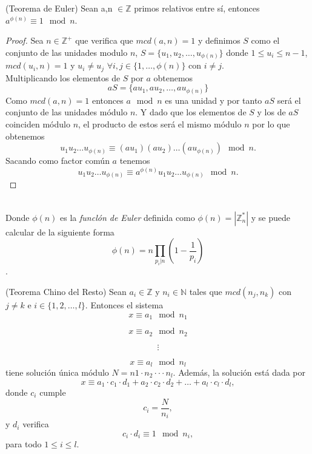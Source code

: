 \begin{teorema}
	(Teorema de Euler) Sean a,n $\in \mathbb{Z}$ primos relativos entre sí, entonces $a^{\phi(n)}\equiv 1 \mod n$.
\end{teorema}\vspace*{-10mm}
\begin{proof}
		Sea $n\in \mathbb{Z^+}$ que verifica que $mcd(a,n)=1$ y definimos $S$ como el conjunto de las unidades modulo $n$, $S=\{u_1,u_2,\dots,u_{\phi(n)}\}$ donde $1\leq u_i\leq n-1$, $mcd(u_i,n)=1$ y $u_i\neq u_j$ $\forall i,j \in \{1,\dots,\phi(n)\}$ con $ i\neq j$.\\
	Multiplicando  los elementos de $S$ por $a$ obtenemos 
	$$
		aS=\{au_1,au_2,\dots,au_{\phi(n)}\}
	$$
	Como $mcd(a,n)=1$ entonces $a\mod n$ es una unidad y por tanto $aS$ será el conjunto de las unidades módulo $n$. Y dado que los elementos de $S$ y los de $aS$ coinciden módulo $n$, el producto de estos será el mismo módulo $n$ por lo que obtenemos 
	$$
		u_1u_2\dots u_{\phi(n)} \equiv (au_1)(au_2)\dots (au_{\phi(n)})\mod n.
	$$
	Sacando como factor común $a$ tenemos 
	$$
		u_1u_2\dots u_{\phi(n)} \equiv a^{\phi(n)}u_1u_2\dots u_{\phi(n)}\mod n.
	$$
\end{proof}\\
Donde $\phi(n)$ es la \emph{funclón de Euler} definida como $\phi(n)=|\mathbb{Z}^*_n|$ y se puede calcular de la siguiente forma $$\phi(n)=n\prod_{p_i|n}\left(1-\frac{1}{p_i}\right)$$.

\begin{teorema}
		(Teorema Chino del Resto) Sean $a_i\in \mathbb{Z}$ y $n_i \in \mathbb{N}$ tales que $mcd(n_j,n_k)$ con $j\neq k$ e $i \in \{1,2,\dots,l\}$. Entonces el sistema
		$$
			x\equiv a_1 \mod n_1
		$$\vspace*{-10mm}

		$$
			x\equiv a_2 \mod n_2
		$$\vspace*{-10mm}

		$$
			\vdots
		$$\vspace*{-10mm}

		$$
			x\equiv a_l \mod n_l
		$$
	tiene solución única módulo $N=n1\cdot n_2\cdot\cdot\cdot n_l$. Además, la solución está dada por
	$$
		x\equiv a_1\cdot c_1\cdot d_1 +a_2\cdot c_2\cdot d_2 +\dots+a_l\cdot c_l\cdot d_l,
	$$
	donde $c_i$ cumple
	$$
		c_i=\frac{N}{n_i},
	$$
	y $d_i$ verifica
	$$
		c_i\cdot d_i \equiv 1 \mod n_i,
	$$
	para todo $1\leq i\leq l$.
	
\end{teorema}

